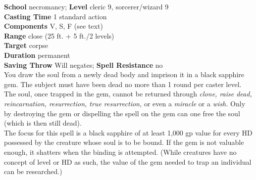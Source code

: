 \textbf{School} necromancy; \textbf{Level} cleric 9, sorcerer/wizard 9\\
\textbf{Casting Time} 1 standard action\\
\textbf{Components} V, S, F (see text)\\
\textbf{Range} close (25 ft. + 5 ft./2 levels)\\
\textbf{Target} corpse\\
\textbf{Duration} permanent\\
\textbf{Saving Throw }Will negates; \textbf{Spell Resistance} no\\
You draw the soul from a newly dead body and imprison it in a black sapphire gem. The subject must have been dead no more than 1 round per caster level. The soul, once trapped in the gem, cannot be returned through \textit{clone, raise dead, reincarnation, resurrection, true resurrection, }or even a \textit{miracle }or a \textit{wish. }Only by destroying the gem or dispelling the spell on the gem can one free the soul (which is then still dead).\\
The focus for this spell is a black sapphire of at least 1,000 gp value for every HD possessed by the creature whose soul is to be bound. If the gem is not valuable enough, it shatters when the binding is attempted. (While creatures have no concept of level or HD as such, the value of the gem needed to trap an individual can be researched.)\\
